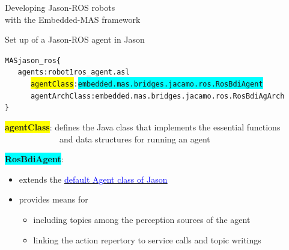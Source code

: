 \documentclass[compress]{beamer}
\begin{document}
\begin{frame}[fragile]{Developing Jason-ROS robots\\ {\scriptsize with the Embedded-MAS framework}}
\vspace{1em}
\scriptsize
\begin{block}{Set up of a Jason-ROS agent in Jason}
 \vspace{-1em}
  \begin{alltt}\scriptsize
   MAS jason\_ros \{  
   \ \ \ agents: robot1 ros\_agent.asl
   \ \ \ \ \ \ \colorbox{yellow}{agentClass}: \colorbox{cyan}{embedded.mas.bridges.jacamo.ros.RosBdiAgent}
   \ \ \ \ \ \ agentArchClass: embedded.mas.bridges.jacamo.ros.RosBdiAgArch
  \}
  \end{alltt}    
   \vspace{-1.2em} 
\end{block}

\footnotesize
\colorbox{yellow}{{\bf agentClass}}: defines the Java class that implements the essential functions\\ \ \ \ \ \ \ \ \ \ \ \ \ \ and data structures for running an agent\\

\vspace{.3cm}

\colorbox{cyan}{{\bf RosBdiAgent}}: 
\begin{itemize}
 \item extends the \href{https://github.com/jason-lang/jason/blob/main/jason-interpreter/src/main/java/jason/asSemantics/Agent.java}{\underline{\textcolor{blue}{default Agent class of Jason}}}\\
 \item provides means for 
 \begin{itemize}\scriptsize
   \item including topics among the perception sources of the agent
   \item linking the action repertory to service calls and topic writings
 \end{itemize}
 
\end{itemize}


 
\end{frame}
\end{document}
